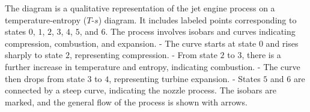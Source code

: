 The diagram is a qualitative representation of the jet engine process on a temperature-entropy (\( T \)-\( s \)) diagram. It includes labeled points corresponding to states \( 0 \), \( 1 \), \( 2 \), \( 3 \), \( 4 \), \( 5 \), and \( 6 \). The process involves isobars and curves indicating compression, combustion, and expansion.  
- The curve starts at state \( 0 \) and rises sharply to state \( 2 \), representing compression.  
- From state \( 2 \) to \( 3 \), there is a further increase in temperature and entropy, indicating combustion.  
- The curve then drops from state \( 3 \) to \( 4 \), representing turbine expansion.  
- States \( 5 \) and \( 6 \) are connected by a steep curve, indicating the nozzle process.  
The isobars are marked, and the general flow of the process is shown with arrows.